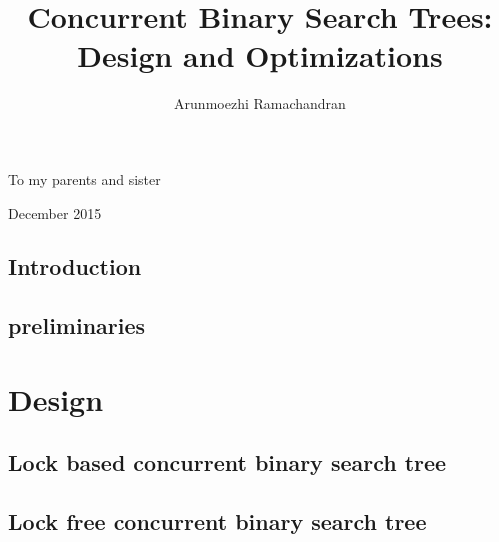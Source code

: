 \documentclass[doublespacing]{utdthesis}
\author{Arunmoezhi Ramachandran}
\title{Concurrent Binary Search Trees: \\ Design and Optimizations}
\newcommand{\preliminaries}{preliminaries}
\begin{document}
\frontmatter

\signaturepage
{} %

\begin{dedication} %
To my parents and sister
\end{dedication}

\maketitle

\begin{acks}{December 2015}

\end{acks}

\begin{preface} %
\prefacetext
\end{preface}

\begin{abstract}

\end{abstract}

\tableofcontents
\listoffigures %
\listoftables %

\mainmatter
\newenvironment{limitscope}{}{}

\chapter{Introduction}
\label{chapter:introduction}


\chapter{\preliminaries}
\label{chapter:\preliminaries}


\part{Design}

\chapter{Lock based concurrent binary search tree}
\label{chapter:castle}


\chapter{Lock free concurrent binary search tree}
\label{chapter:icdcn}

\end{document}

